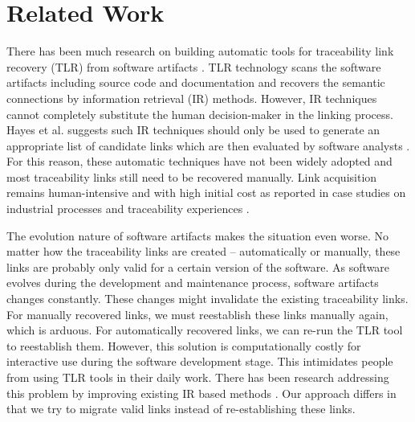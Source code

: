 \section{Related Work}
\label{sec:related}
There has been much research on building automatic tools for traceability link recovery (TLR) from software artifacts \cite{antoniol_recoveringtraceability_2002} \cite{deLucia_incremental_2006} \cite{marcus_recovering_2003}.
TLR technology scans the software artifacts including source code and documentation and recovers the semantic connections by information retrieval (IR) methods.
However, IR techniques cannot completely substitute the human decision-maker in the linking process.
Hayes et al. suggests such IR techniques should only be used to generate an appropriate list of candidate links which are then evaluated by software analysts \cite{hayes_advancing_2006}.
For this reason, these automatic techniques have not been widely adopted and most traceability links still need to be recovered manually.
Link acquisition remains human-intensive and with high initial cost as reported in case studies on industrial processes and traceability experiences \cite{lindvall_practical_1996} \cite{ramesh_implementing_1995} \cite{asuncion_an_2007} \cite{gotel_extended_1997} \cite{neumuller_case_2006}.

The evolution nature of software artifacts makes the situation even worse.
No matter how the traceability links are created -- automatically or manually,
these links are probably only valid for a certain version of the software.
As software evolves during the development and maintenance process, software artifacts changes constantly.
These changes might invalidate the existing traceability links.
For manually recovered links, we must reestablish these links manually again, which is arduous.
For automatically recovered links, we can re-run the TLR tool to reestablish them.
However, this solution is computationally costly for interactive use during the software development stage.
This intimidates people from using TLR tools in their daily work.
There has been research addressing this problem by improving existing IR based methods \cite{jiang_incremental_2008}.
Our approach differs in that we try to migrate valid links instead of re-establishing these links.

